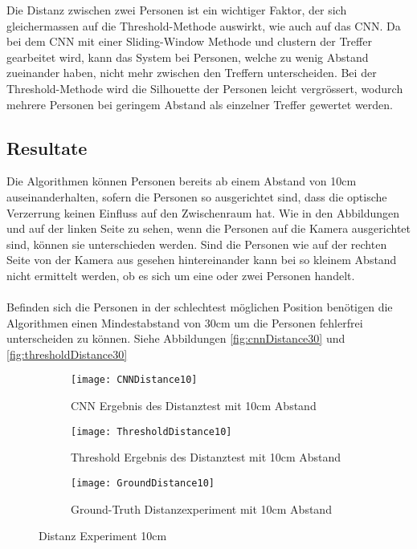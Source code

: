 Die Distanz zwischen zwei Personen ist ein wichtiger Faktor, der sich gleichermassen auf die Threshold-Methode auswirkt, wie auch auf das \gls{CNN}. Da bei dem \gls{CNN} mit einer Sliding-Window Methode und clustern der Treffer gearbeitet wird, kann das System bei Personen, welche zu wenig Abstand zueinander haben, nicht mehr zwischen den Treffern unterscheiden. Bei der Threshold-Methode wird die Silhouette der Personen leicht vergrössert, wodurch mehrere Personen bei geringem Abstand als einzelner Treffer gewertet werden.

\subsection{Resultate}

Die Algorithmen können Personen bereits ab einem Abstand von 10cm auseinanderhalten, sofern die Personen so ausgerichtet sind, dass die optische Verzerrung keinen Einfluss auf den Zwischenraum hat. Wie in den Abbildungen und auf der linken Seite zu sehen, wenn die Personen auf die Kamera ausgerichtet sind, können sie unterschieden werden. Sind die Personen wie auf der rechten Seite von der Kamera aus gesehen hintereinander kann bei so kleinem Abstand nicht ermittelt werden, ob es sich um eine oder zwei Personen handelt.\\
\\
Befinden sich die Personen in der schlechtest möglichen Position benötigen die Algorithmen einen Mindestabstand von 30cm um die Personen fehlerfrei unterscheiden zu können. Siehe Abbildungen \ref{fig:cnnDistance30} und \ref{fig:thresholdDistance30}

\begin{figure}[H]
	\begin{subfigure}{.45\linewidth}
		\centering
		\texttt{[image: CNNDistance10]}
		\caption{\gls{CNN} Ergebnis des Distanztest mit 10cm Abstand}
		\label{fig:cnnDistance10}
	\end{subfigure}\hfill%
	\begin{subfigure}{.45\linewidth}
		\centering
		\texttt{[image: ThresholdDistance10]}
		\caption{Threshold Ergebnis des Distanztest mit 10cm Abstand}
		\label{fig:thresholdDistance10}
	\end{subfigure}
	\begin{subfigure}{\linewidth}
		\centering
		\texttt{[image: GroundDistance10]}
		\caption{Ground-Truth Distanzexperiment mit 10cm Abstand}
		\label{fig:groundDistance10}
	\end{subfigure}
	\caption{Distanz Experiment 10cm}
	\label{fig:Distance10}
\end{figure}



